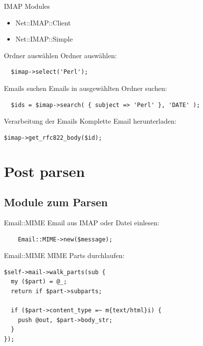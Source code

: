 \begin{frame}{IMAP Modules}
  \begin{itemize}
  \item Net::IMAP::Client
  \item Net::IMAP::Simple
  \end{itemize}
\end{frame}

\begin{frame}[fragile]{Ordner auswählen}
  Ordner auswählen:

\begin{lstlisting}
  $imap->select('Perl');
\end{lstlisting}
\end{frame}

\begin{frame}[fragile]{Emails suchen}
  Emails in ausgewählten Ordner suchen:

\begin{lstlisting}
  $ids = $imap->search( { subject => 'Perl' }, 'DATE' );
\end{lstlisting}
\end{frame}

\begin{frame}[fragile]{Verarbeitung der Emails}
  Komplette Email herunterladen:

\begin{lstlisting}
$imap->get_rfc822_body($id);
\end{lstlisting}

\end{frame}

\section{Post parsen}

\subsection{Module zum Parsen}

\begin{frame}[fragile]{Email::MIME}
  Email aus IMAP oder Datei einlesen:

  \begin{lstlisting}
    Email::MIME->new($message);
  \end{lstlisting}

\end{frame}

\begin{frame}[fragile]{Email::MIME}
MIME Parts durchlaufen:

\begin{lstlisting}
$self->mail->walk_parts(sub {
  my ($part) = @_;
  return if $part->subparts;

  if ($part->content_type =~ m{text/html}i) {
    push @out, $part->body_str;
  }
});
\end{lstlisting}
\end{frame}

